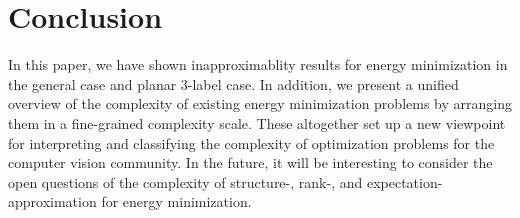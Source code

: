 \section{Conclusion}

In this paper, we have shown inapproximablity results for energy minimization in the general case and planar 3-label case. In addition, we present a unified overview of the complexity of existing energy minimization problems by arranging them in a fine-grained complexity scale. These altogether set up a new viewpoint for interpreting and classifying the complexity of optimization problems for the computer vision community.  In the future, it will be interesting to consider the open questions of the complexity of structure-, rank-, and expectation-approximation for energy minimization.

